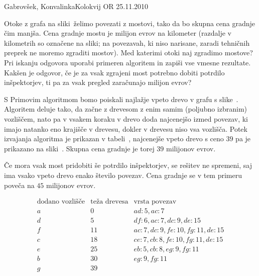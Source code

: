 \begin{naloga}{Gabrovšek, Konvalinka}{Kolokvij OR 25.11.2010}
\begin{vprasanje}
Otoke z grafa na sliki~\fig želimo povezati z mostovi,
tako da bo skupna cena grad\-nje čim manjša.
Cena gradnje mostu je milijon evrov na kilometer
(razdalje v kilometrih so označene na sliki;
na povezavah, ki niso narisane,
zaradi tehničnih preprek ne moremo zgraditi mostov).
Med katerimi otoki naj zgradimo mostove?
Pri iskanju odgovora uporabi primeren algoritem
in zapiši vse vmesne rezultate.
Kakšen je odgovor,
če je za vsak zgrajeni most potrebno dobiti potrdilo inšpektorjev,
ti pa za vsak pregled zaračunajo milijon evrov?

\begin{slika}
\pgfslika
{}
\end{slika}
\end{vprasanje}

\begin{odgovor}
S Primovim algoritmom bomo poiskali najlažje vpeto drevo v grafu s slike~\fig.
Algoritem deluje tako,
da začne z drevesom z enim samim (poljubno izbranim) vozliščem,
nato pa v vsakem koraku v drevo doda najcenejšo izmed povezav,
ki imajo natanko eno krajišče v drevesu,
dokler v drevesu niso vsa vozlišča.
Potek izvajanja algoritma je prikazan v tabeli~\tab,
najcenejše vpeto drevo s ceno $39$
pa je prikazano na sliki~.
Skupna cena gradnje je torej $39$ milijonov evrov.

Če mora vsak most pridobiti še potrdilo inšpektorjev,
se rešitev ne spremeni,
saj ima vsako vpeto drevo enako število povezav.
Cena gradnje se v tem primeru poveča na $45$ milijonov evrov.
%
\begin{tabela}
$$
\begin{array}{c|c|l}
\text{dodano vozlišče} & \text{teža drevesa} & \text{vrsta povezav} \\ \hline
a &  0 & ad: 5, ac: 7 \\
d &  5 & df: 6, ac: 7, dc: 9, de: 15 \\
f & 11 & ac: 7, dc: 9, fe: 10, fg: 11, de: 15 \\
c & 18 & ce: 7, cb: 8, fe: 10, fg: 11, de: 15 \\
e & 25 & eb: 5, cb: 8, eg: 9, fg: 11 \\
b & 30 & eg: 9, fg: 11 \\
g & 39 &
\end{array}
$$
\end{tabela}
%
\begin{slika}
\end{slika}
\end{odgovor}
\end{naloga}
